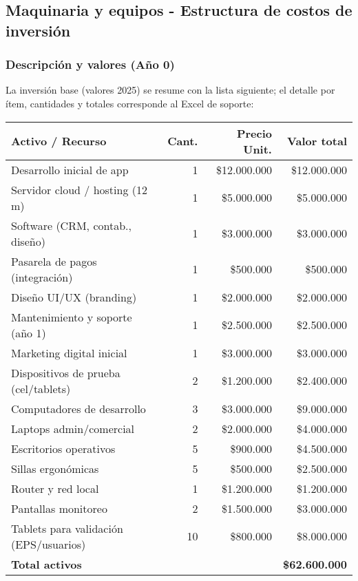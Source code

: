 \subsection{Maquinaria y equipos - Estructura de costos de inversión}

\subsubsection{Descripción y valores (Año 0)}
La inversión base (valores 2025) se resume con la lista siguiente; el detalle por ítem, cantidades y totales corresponde al Excel de soporte:

\begin{table}[H]
\centering
\renewcommand{\arraystretch}{1.12}
\begin{tabular}{p{8.2cm} r r r}
\toprule
\textbf{Activo / Recurso} & \textbf{Cant.} & \textbf{Precio Unit.} & \textbf{Valor total}\\
\midrule
Desarrollo inicial de app & 1 & \$12.000.000 & \$12.000.000\\
Servidor cloud / hosting (12 m) & 1 & \$5.000.000 & \$5.000.000\\
Software (CRM, contab., diseño) & 1 & \$3.000.000 & \$3.000.000\\
Pasarela de pagos (integración) & 1 & \$500.000 & \$500.000\\
Diseño UI/UX (branding) & 1 & \$2.000.000 & \$2.000.000\\
Mantenimiento y soporte (año 1) & 1 & \$2.500.000 & \$2.500.000\\
Marketing digital inicial & 1 & \$3.000.000 & \$3.000.000\\
Dispositivos de prueba (cel/tablets) & 2 & \$1.200.000 & \$2.400.000\\
Computadores de desarrollo & 3 & \$3.000.000 & \$9.000.000\\
Laptops admin/comercial & 2 & \$2.000.000 & \$4.000.000\\
Escritorios operativos & 5 & \$900.000 & \$4.500.000\\
Sillas ergonómicas & 5 & \$500.000 & \$2.500.000\\
Router y red local & 1 & \$1.200.000 & \$1.200.000\\
Pantallas monitoreo & 2 & \$1.500.000 & \$3.000.000\\
Tablets para validación (EPS/usuarios) & 10 & \$800.000 & \$8.000.000\\
\midrule
\textbf{Total activos} & & & \textbf{\$62.600.000}\\
\bottomrule
\end{tabular}
\end{table}

